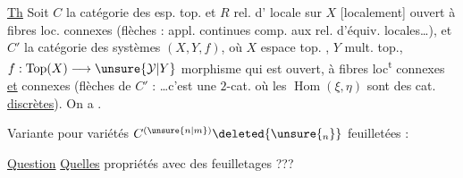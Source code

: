 
\uline{Th} Soit $C$ la catégorie des 
esp. top.  et $R$ rel. d'
locale sur $X$ [localement] ouvert à fibres loc.
connexes  
(flèches : appl. continues comp. aux rel.
d'équiv. locales\ldots), et $C'$ la catégorie des
  systèmes $(X,Y,f)$,
où $X$ espace top. ,
$Y$ mult. top., $f:\operatorname{Top}(X)\longrightarrow\unsure{\mathcal{Y}|Y}$
morphisme qui est  ouvert,
à fibres loc\textsuperscript{t} connexes \uline{et}
connexes (flèches de $C'$ : \ldots c'est une $2$-cat.
où les \uline{$\operatorname{Hom}$}$(\xi,\eta)$ sont des cat. \uline{discrètes}). On a
.


Variante pour variétés 
$C^{(\unsure{n|m})}\deleted{\unsure{{}_{n}}}$ feuilletées :

\uline{Question} \uline{Quelles} propriétés 
avec des feuilletages ???
